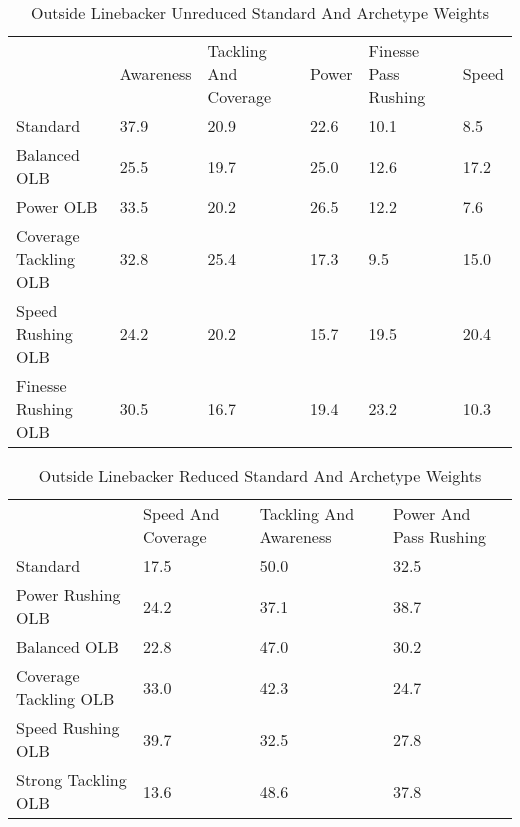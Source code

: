\documentclass[11pt]{article}
\begin{document}
\begin{table}[]
\centering
\caption{Outside Linebacker Unreduced Standard And Archetype Weights}
\label{OutsideLinebackerUnreducedWeights}
\begin{tabular}{llllll}
                      & Awareness & Tackling And Coverage & Power & Finesse Pass Rushing & Speed \\
Standard              & 37.9      & 20.9                  & 22.6  & 10.1                 & 8.5   \\
Balanced OLB          & 25.5      & 19.7                  & 25.0  & 12.6                 & 17.2  \\
Power OLB             & 33.5      & 20.2                  & 26.5  & 12.2                 & 7.6   \\
Coverage Tackling OLB & 32.8      & 25.4                  & 17.3  & 9.5                  & 15.0  \\
Speed Rushing OLB     & 24.2      & 20.2                  & 15.7  & 19.5                 & 20.4  \\
Finesse Rushing OLB   & 30.5      & 16.7                  & 19.4  & 23.2                 & 10.3 
\end{tabular}
\end{table}

\begin{table}[]
\centering
\caption{Outside Linebacker Reduced Standard And Archetype Weights}
\label{OutsideLinebackerReducedWeights}
\begin{tabular}{llll}
                      & Speed And Coverage & Tackling And Awareness & Power And Pass Rushing \\
Standard              & 17.5               & 50.0                   & 32.5                   \\
Power Rushing OLB     & 24.2               & 37.1                   & 38.7                   \\
Balanced OLB          & 22.8               & 47.0                   & 30.2                   \\
Coverage Tackling OLB & 33.0               & 42.3                   & 24.7                   \\
Speed Rushing OLB     & 39.7               & 32.5                   & 27.8                   \\
Strong Tackling OLB   & 13.6               & 48.6                   & 37.8                  
\end{tabular}
\end{table}
\end{document}
